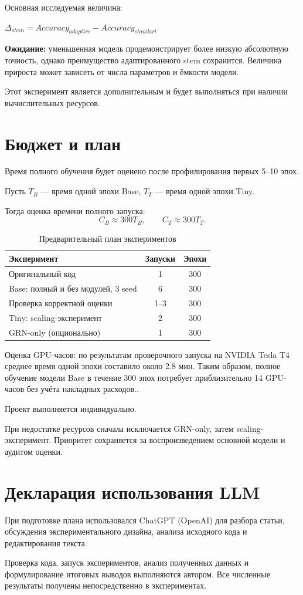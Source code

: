 \documentclass[11pt,a4paper]{article}
\begin{document}
Основная исследуемая величина:

$\Delta_{stem} = Accuracy_{adaptive} - Accuracy_{standart}$


\textbf{Ожидание:}
уменьшенная модель продемонстрирует более низкую абсолютную точность, однако преимущество адаптированного stem сохранится. Величина прироста может зависеть от числа параметров и ёмкости модели.

Этот эксперимент является дополнительным и будет выполняться при наличии вычислительных ресурсов.


\section{Бюджет и план}

Время полного обучения будет оценено
после профилирования первых 5--10 эпох.

Пусть $T_B$ --- время одной эпохи Base,
$T_T$ --- время одной эпохи Tiny.

Тогда оценка времени полного запуска:
\[
C_B \approx 300T_B,
\qquad
C_T \approx 300T_T.
\]

\begin{table}[h]
\centering
\small
\caption{Предварительный план экспериментов}
\begin{tabularx}{\linewidth}{Xcc}
\toprule
Эксперимент & Запуски & Эпохи \\
\midrule
Оригинальный код & 1 & 300 \\
Base: полный и без модулей, 3 seed & 6 & 300 \\
Проверка корректной оценки & 1--3 & 300 \\
Tiny: scaling-эксперимент & 2 & 300 \\
GRN-only (опционально) & 1 & 300 \\
\bottomrule
\end{tabularx}
\end{table}

Оценка GPU-часов:
по результатам проверочного запуска
на NVIDIA Tesla T4 среднее время одной эпохи
составило около 2.8 мин.
Таким образом, полное обучение модели Base
в течение 300 эпох потребует приблизительно
14 GPU-часов без учёта накладных расходов..

Проект выполняется индивидуально.

При недостатке ресурсов сначала исключается
GRN-only, затем scaling-эксперимент.
Приоритет сохраняется за воспроизведением
основной модели и аудитом оценки.

\section{Декларация использования LLM}

При подготовке плана использовался ChatGPT
(OpenAI) для разбора статьи, обсуждения
экспериментального дизайна, анализа
исходного кода и редактирования текста.

Проверка кода, запуск экспериментов,
анализ полученных данных и формулирование
итоговых выводов выполняются автором.
Все численные результаты получены
непосредственно в экспериментах.
\end{document}
